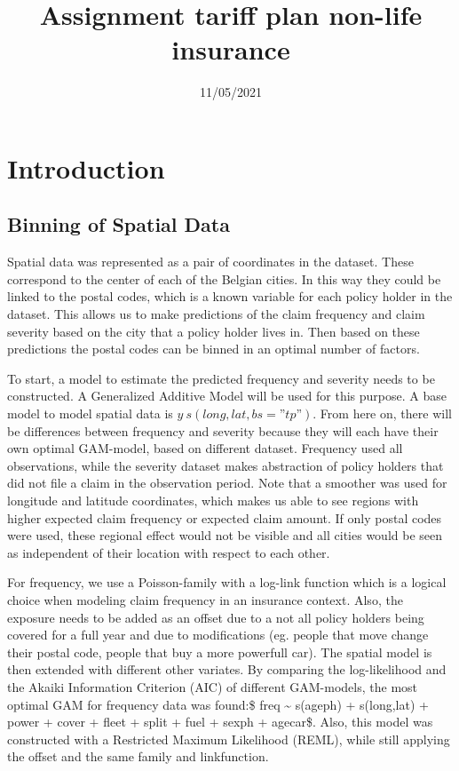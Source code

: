 \documentclass[
  12pt,
]{article}
\title{Assignment tariff plan non-life insurance}
\author{}
\date{\vspace{-2.5em}11/05/2021}
\begin{document}
\maketitle

\tableofcontents
\pagebreak

\hypertarget{introduction}{%
\section{Introduction}\label{introduction}}

\hypertarget{binning-of-spatial-data}{%
\subsection{Binning of Spatial Data}\label{binning-of-spatial-data}}

Spatial data was represented as a pair of coordinates in the dataset.
These correspond to the center of each of the Belgian cities. In this
way they could be linked to the postal codes, which is a known variable
for each policy holder in the dataset. This allows us to make
predictions of the claim frequency and claim severity based on the city
that a policy holder lives in. Then based on these predictions the
postal codes can be binned in an optimal number of factors.

To start, a model to estimate the predicted frequency and severity needs
to be constructed. A Generalized Additive Model will be used for this
purpose. A base model to model spatial data is
\(y ~ s(long, lat, bs=”tp”)\). From here on, there will be differences
between frequency and severity because they will each have their own
optimal GAM-model, based on different dataset. Frequency used all
observations, while the severity dataset makes abstraction of policy
holders that did not file a claim in the observation period. Note that a
smoother was used for longitude and latitude coordinates, which makes us
able to see regions with higher expected claim frequency or expected
claim amount. If only postal codes were used, these regional effect
would not be visible and all cities would be seen as independent of
their location with respect to each other.

For frequency, we use a Poisson-family with a log-link function which is
a logical choice when modeling claim frequency in an insurance context.
Also, the exposure needs to be added as an offset due to a not all
policy holders being covered for a full year and due to modifications
(eg. people that move change their postal code, people that buy a more
powerfull car). The spatial model is then extended with different other
variates. By comparing the log-likelihood and the Akaiki Information
Criterion (AIC) of different GAM-models, the most optimal GAM for
frequency data was found:\$ freq \textasciitilde{} s(ageph) +
s(long,lat) + power + cover + fleet + split + fuel + sexph + agecar\$.
Also, this model was constructed with a Restricted Maximum Likelihood
(REML), while still applying the offset and the same family and
linkfunction.
\end{document}
